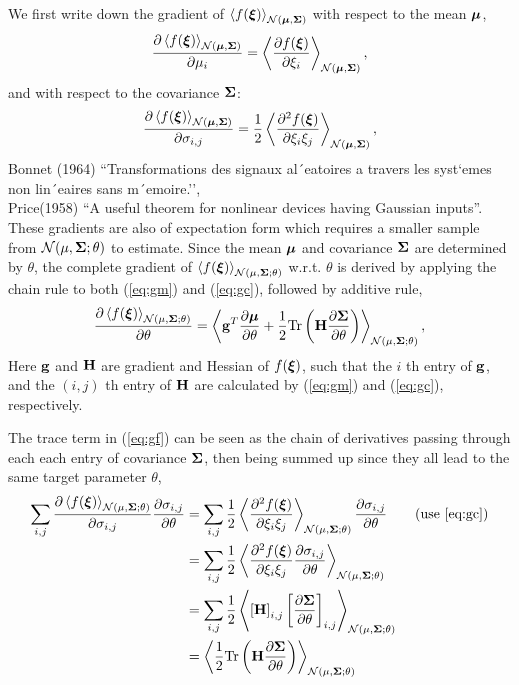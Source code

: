 \documentclass[11pt]{article} \usepackage{textcomp,bbding,subfig}
\begin{document}
We first write down the gradient of $\funs$ with respect to the mean
$\bs{\mu}$,
\begin{align}\label{eq:gm} %
  \PDV{\funs}{\mu_i} = \mean{\PDV{f(\bs{\xi})}{\xi_i}}{\dsts},
\end{align}
and with respect to the covariance $\bs{\Sigma}$:
\begin{align}\label{eq:gc} %
  \PDV{\funs}{\sigma_{i, j}} =
  \frac{1}{2}\mean{\PDV{^2f(\bs{\xi})}{\xi_i\xi_j}}{\dsts},
\end{align}
\scriptsize Bonnet (1964) ``Transformations des signaux al´eatoires a
travers les syst`emes non lin´eaires sans m´emoire.'', \\
Price(1958) ``A useful theorem for nonlinear devices having Gaussian
inputs''.  \normalsize\\
These gradients are also of expectation form which requires a smaller
sample from $\dstp$ to estimate. Since the mean $\bs{\mu}$ and
covariance $\bs{\Sigma}$ are determined by $\theta$, the complete
gradient of $\funp$ w.r.t. $\theta$ is derived by applying the chain
rule to both (\ref{eq:gm}) and (\ref{eq:gc}), followed by additive
rule,
\begin{align}\label{eq:gf}
  \PDV{\mean{f(\bs{\xi})}{\dstp}}{\theta} =
  \mean{
  \vg^T \PDV{\bs{\mu}}{\theta} + 
  \frac{1}{2} \trb{\xh \PDV{\bs{\Sigma}}{\theta}}
  } {\dstp},
\end{align}
Here $\vg$ and $\xh$ are gradient and Hessian of $f(\bs{\xi})$, such
that the $i$ th entry of $\vg$, and the $(i, j)$ th entry of $\xh$ are
calculated by (\ref{eq:gm}) and (\ref{eq:gc}), respectively.

The trace term in (\ref{eq:gf}) can be seen as the chain of
derivatives passing through each each entry of covariance
$\bs{\Sigma}$, then being summed up since they all lead to the same
target parameter $\theta$,
\begin{align*}
  \sum_{i,j} \PDV{\mean{f(\bs{\xi})}{\dstp}}{\sigma_{i,j}}               \PDV{\sigma_{i,j}}{\theta} 
  &= \sum_{i,j} \frac{1}{2}\mean{\PDV{^2f(\bs{\xi})}{\xi_i\xi_j}}{\dstp} \PDV{\sigma_{i,j}}{\theta} \qquad (\textrm{use } \ref{eq:gc})\\
  &= \sum_{i,j} \frac{1}{2}\mean{\PDV{^2f(\bs{\xi})}{\xi_i\xi_j} \PDV{\sigma_{i,j}}{\theta}}{\dstp} \\
  &= \sum_{i,j} \frac{1}{2}\mean{\left[\xh\right]_{i,j} \left[\PDV{\bs{\Sigma}}{\theta}\right]_{i,j}}{\dstp} \\
  &= \mean{\frac{1}{2}\trb{\xh \PDV{\bs{\Sigma}}{\theta}}}{\dstp}
\end{align*}
\end{document}
